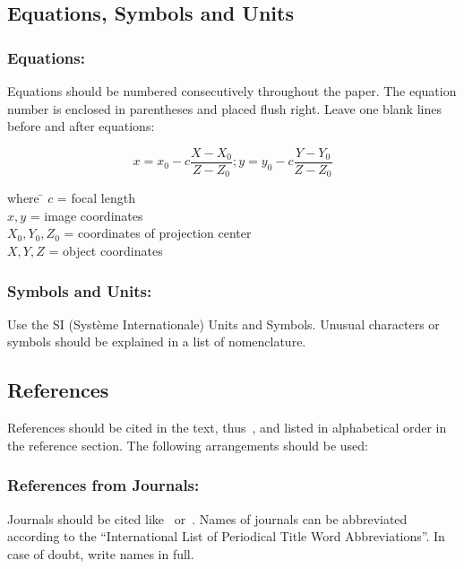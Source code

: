 \documentclass{isprs} %
\begin{document}
\subsection{Equations, Symbols and Units}\label{sec:Equations, Symbols and Units}

\subsubsection{Equations:}\label{sec:Equations}

Equations should be numbered consecutively throughout the paper. The equation 
number is enclosed in parentheses and placed flush right. Leave one blank lines 
before and after equations: 


\begin{equation}\label{equ:1}
	x = x_0 -c \frac{X - X_0}{Z - Z_0}; y = y_0 -c \frac{Y - Y_0}{Z - Z_0}
\end{equation}

\begin{tabbing} 
where \hspace{0.6cm} \= $c$ = focal length\\
\> $x,y$ = image coordinates\\
\> $X_0,Y_0, Z_0$ = coordinates of projection center\\
\> $X, Y, Z$ = object coordinates
\end{tabbing}

\subsubsection{Symbols and Units:}\label{sec:Symbols and Units}
Use the SI (Syst\`{e}me Internationale) Units and Symbols. Unusual characters 
or symbols should be explained in a list of nomenclature.

\subsection{References}\label{sec:References}
References should be cited in the text, thus~\cite{smith1987rep}, and listed in alphabetical order in the reference section. The following arrangements should be used:

\subsubsection{References from Journals:} 
Journals should be cited like~\cite{smith1987} or~\cite{michalis2008}. Names of journals can be abbreviated according to the ``International List of Periodical Title Word Abbreviations''. In case of doubt, write names in full.
\end{document}
